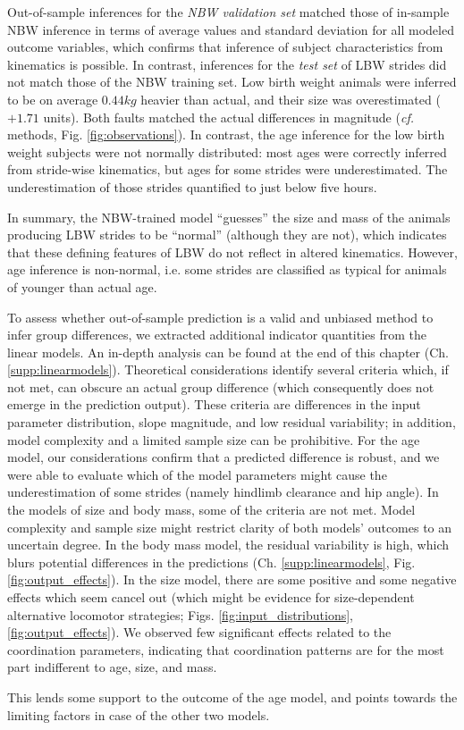 Out-of-sample inferences for the \emph{NBW validation set} matched those of in-sample NBW inference in terms of average values and standard deviation for all modeled outcome variables, which confirms that inference of subject characteristics from kinematics is possible.
In contrast, inferences for the \emph{test set} of LBW strides did not match those of the NBW training set.
Low birth weight animals were inferred to be on average \(0.44 kg\) heavier than actual, and their size was overestimated (\(+1.71\)
units).
Both faults matched the actual differences in magnitude (\emph{cf.} methods, Fig. \ref{fig:observations}).
In contrast, the age inference for the low birth weight subjects were not normally distributed: most ages were correctly inferred from stride-wise kinematics, but ages for some strides were underestimated.
The underestimation of those strides quantified to just below five hours.

In summary, the NBW-trained model ``guesses'' the size and mass of the animals producing LBW strides to be ``normal'' (although they are not), which indicates that these defining features of LBW do not reflect in altered kinematics.
However, age inference is non-normal, i.e. some strides are classified as typical for animals of younger than actual age.
\bigskip

\begin{change}
To assess whether out-of-sample prediction is a valid and unbiased method to infer group differences, we extracted additional indicator quantities from the linear models.
An in-depth analysis can be found at the end of this chapter (Ch. \ref{supp:linearmodels}).
Theoretical considerations identify several criteria which, if not met, can obscure an actual group difference (which consequently does not emerge in the prediction output).
These criteria are differences in the input parameter distribution, slope magnitude, and low residual variability; in addition, model complexity and a limited sample size can be prohibitive.
For the age model, our considerations confirm that a predicted difference is robust, and we were able to evaluate which of the model parameters might cause the underestimation of some strides (namely hindlimb clearance and hip angle).
In the models of size and body mass, some of the criteria are not met.
Model complexity and sample size might restrict clarity of both models' outcomes to an uncertain degree.
In the body mass model, the residual variability is high, which blurs potential differences in the predictions (Ch. \ref{supp:linearmodels}, Fig. \ref{fig:output_effects}).
In the size model, there are some positive and some negative effects which seem cancel out (which might be evidence for size-dependent alternative locomotor strategies; Figs. \ref{fig:input_distributions}, \ref{fig:output_effects}).
We observed few significant effects related to the coordination parameters, indicating that coordination patterns are for the most part indifferent to age, size, and mass.


This lends some support to the outcome of the age model, and points towards the limiting factors in case of the other two models.

\end{change}
\bigskip


